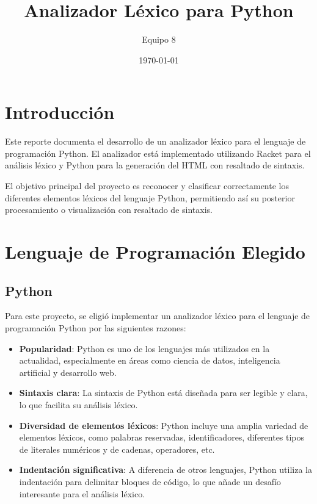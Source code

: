 \documentclass[12pt,letterpaper]{report}
\title{Analizador Léxico para Python}
\author{Equipo 8}
\date{\today}
\begin{document}
\maketitle
\tableofcontents

\chapter{Introducción}

Este reporte documenta el desarrollo de un analizador léxico para el lenguaje de programación Python. El analizador está implementado utilizando Racket para el análisis léxico y Python para la generación del HTML con resaltado de sintaxis.

El objetivo principal del proyecto es reconocer y clasificar correctamente los diferentes elementos léxicos del lenguaje Python, permitiendo así su posterior procesamiento o visualización con resaltado de sintaxis.

\chapter{Lenguaje de Programación Elegido}

\section{Python}

Para este proyecto, se eligió implementar un analizador léxico para el lenguaje de programación Python por las siguientes razones:

\begin{itemize}
    \item \textbf{Popularidad}: Python es uno de los lenguajes más utilizados en la actualidad, especialmente en áreas como ciencia de datos, inteligencia artificial y desarrollo web.
    \item \textbf{Sintaxis clara}: La sintaxis de Python está diseñada para ser legible y clara, lo que facilita su análisis léxico.
    \item \textbf{Diversidad de elementos léxicos}: Python incluye una amplia variedad de elementos léxicos, como palabras reservadas, identificadores, diferentes tipos de literales numéricos y de cadenas, operadores, etc.
    \item \textbf{Indentación significativa}: A diferencia de otros lenguajes, Python utiliza la indentación para delimitar bloques de código, lo que añade un desafío interesante para el análisis léxico.
\end{itemize}
\end{document}
